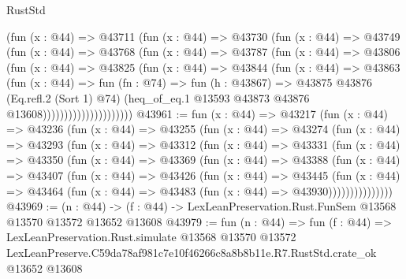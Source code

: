 \begin{lexlean}{RustStd}
\begin{coremodule}
                        (fun (x : @44) =>
                        @43711
                          (fun (x : @44) =>
                          @43730
                            (fun (x : @44) =>
                            @43749
                              (fun (x : @44) =>
                              @43768
                                (fun (x : @44) =>
                                @43787
                                  (fun (x : @44) =>
                                  @43806
                                    (fun (x : @44) =>
                                    @43825
                                      (fun (x : @44) =>
                                      @43844
                                        (fun (x : @44) =>
                                        @43863
                                          (fun (x : @44) =>
                                          fun (fn : @74) =>
                                          fun (h : @43867) =>
                                          @43875
                                            @43876
                                            (Eq.refl.{2} (Sort 1) @74)
                                            (heq_of_eq.{1}
                                              @13593
                                              @43873
                                              @43876
                                              @13608)))))))))))))))))))))
@43961 := fun (x : @44) =>
  @43217
    (fun (x : @44) =>
    @43236
      (fun (x : @44) =>
      @43255
        (fun (x : @44) =>
        @43274
          (fun (x : @44) =>
          @43293
            (fun (x : @44) =>
            @43312
              (fun (x : @44) =>
              @43331
                (fun (x : @44) =>
                @43350
                  (fun (x : @44) =>
                  @43369
                    (fun (x : @44) =>
                    @43388
                      (fun (x : @44) =>
                      @43407
                        (fun (x : @44) =>
                        @43426
                          (fun (x : @44) =>
                          @43445
                            (fun (x : @44) =>
                            @43464 (fun (x : @44) => @43483 (fun (x : @44) => @43930)))))))))))))))
@43969 := (n : @44) ->
  (f : @44) -> LexLeanPreservation.Rust.FunSem @13568 @13570 @13572 @13652 @13608
@43979 := fun (n : @44) =>
  fun (f : @44) =>
  LexLeanPreservation.Rust.simulate
    @13568
    @13570
    @13572
    LexLeanPreserve.C59da78af981c7e10f46266c8a8b8b11e.R7.RustStd.crate_ok
    @13652
    @13608
\end{coremodule}
\end{lexlean}
